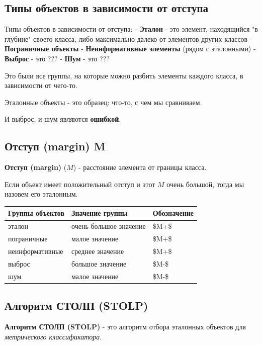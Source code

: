 \subsection{Типы объектов в зависимости от отступа}

Типы объектов в зависимости от отступа:
- \textbf{Эталон} - это элемент, находящийся "в глубине" своего класса, либо
максимально далеко от элементов других классов
- \textbf{Пограничные объекты}
- \textbf{Неинформативные элементы} (рядом с эталонными)
- \textbf{Выброс} - это ???
- \textbf{Шум} - это ???

Это были все группы, на которые можно разбить элементы каждого класса, в
зависимости от чего-то.

Эталонные объекты - это образец: что-то, с чем мы сравниваем.

И выброс, и шум являются \textbf{ошибкой}.

\subsection{Отступ (margin) M}

\textbf{Отступ (margin)} ($M$) - расстояние элемента от границы класса.

Если объект имеет положительный отступ и этот $M$ очень большой, тогда мы
назовем его эталонным.

\begin{table}[!h]
    \centering
    \begin{tabular}{|l|l|l|}
    \hline
        Группы объектов & Значение группы & Обозначение \\ \hline
        эталон & очень большое значение & \$M+\$ \\ \hline
        пограничные & малое значение & \$M+\$ \\ \hline
        неинформативные & среднее значение & \$M+\$ \\ \hline
        выброс & большое значение & \$M-\$ \\ \hline
        шум & малое значение & \$M-\$ \\ \hline
    \end{tabular}
\end{table}

\subsection{Алгоритм СТОЛП (STOLP)}

\textbf{Алгоритм СТОЛП (STOLP)} - это алгоритм отбора эталонных объектов для
\textit{метрического классификатора}.

